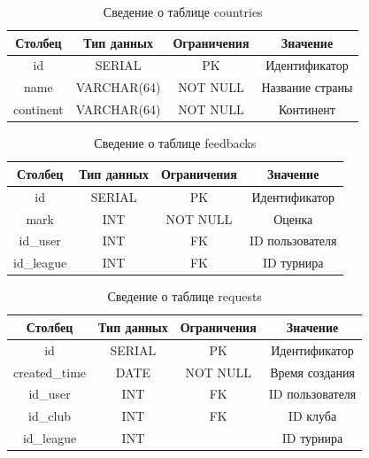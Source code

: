 \begin{table}[H]
	\begin{center}
		\caption{Сведение о таблице countries}
		\begin{tabular}{|c|c|c|c|}
			\hline
			Столбец & Тип данных & Ограничения & Значение \\
			\hline
			id & SERIAL & PK & Идентификатор \\
			\hline
			name & VARCHAR(64) & NOT NULL & Название страны \\
			\hline
			continent & VARCHAR(64) & NOT NULL & Континент \\
			\hline
		\end{tabular}
		\label{table:db:country}
	\end{center}
\end{table}

\begin{table}[H]
	\begin{center}
		\caption{Сведение о таблице feedbacks}
		\begin{tabular}{|c|c|c|c|}
			\hline
			Столбец & Тип данных & Ограничения & Значение \\
			\hline
			id & SERIAL & PK & Идентификатор \\
			\hline
			mark & INT & NOT NULL & Оценка \\
			\hline
			id\_user & INT & FK & ID пользователя \\
			\hline
			id\_league & INT & FK & ID турнира \\
			\hline
		\end{tabular}
		\label{table:db:feedback}
	\end{center}
\end{table}

\begin{table}[H]
	\begin{center}
		\caption{Сведение о таблице requests}
		\begin{tabular}{|c|c|c|c|}
			\hline
			Столбец & Тип данных & Ограничения & Значение \\
			\hline
			id & SERIAL & PK & Идентификатор \\
			\hline
			created\_time & DATE & NOT NULL & Время создания \\
			\hline
			id\_user & INT & FK & ID пользователя \\
			\hline
			id\_club & INT & FK & ID клуба \\
			\hline
			id\_league & INT &  & ID турнира \\
			\hline
		\end{tabular}
		\label{table:db:request}
	\end{center}
\end{table}


